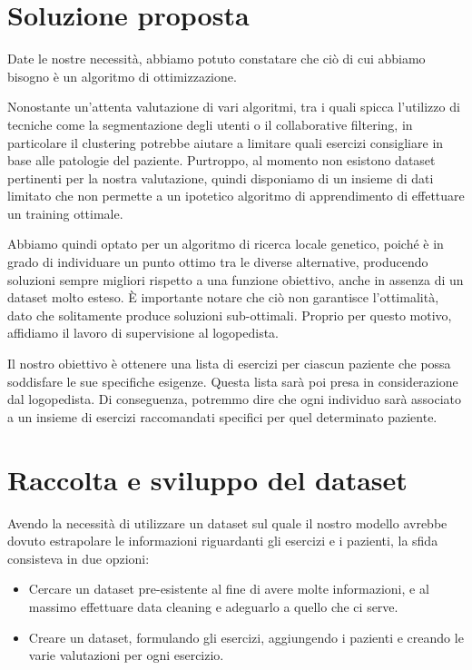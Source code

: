 \documentclass{article}
\begin{document}
    \pagebreak

    \section{Soluzione proposta}

    Date le nostre necessità, abbiamo potuto constatare che ciò di cui abbiamo bisogno è un algoritmo di ottimizzazione.

    Nonostante un'attenta valutazione di vari algoritmi, tra i quali spicca l'utilizzo di tecniche come la segmentazione degli utenti o il collaborative filtering,
    in particolare il clustering potrebbe aiutare a limitare quali esercizi consigliare in base alle patologie del paziente. Purtroppo, al momento non esistono
    dataset pertinenti per la nostra valutazione, quindi disponiamo di un insieme di dati limitato che non permette a un ipotetico algoritmo di apprendimento di
    effettuare un training ottimale.

    Abbiamo quindi optato per un algoritmo di ricerca locale genetico, poiché è in grado di individuare un punto ottimo tra le diverse alternative, producendo
    soluzioni sempre migliori rispetto a una funzione obiettivo, anche in assenza di un dataset molto esteso. È importante notare che ciò non garantisce l'ottimalità,
    dato che solitamente produce soluzioni sub-ottimali. Proprio per questo motivo, affidiamo il lavoro di supervisione al logopedista.

    Il nostro obiettivo è ottenere una lista di esercizi per ciascun paziente che possa soddisfare le sue specifiche esigenze. Questa lista sarà poi presa in
    considerazione dal logopedista. Di conseguenza, potremmo dire che ogni individuo sarà associato a un insieme di esercizi raccomandati specifici per quel determinato
    paziente.

    \section{Raccolta e sviluppo del dataset}

    Avendo la necessità di utilizzare un dataset sul quale il nostro modello avrebbe dovuto estrapolare le informazioni riguardanti gli esercizi e i pazienti, la sfida consisteva in due opzioni:

    \begin{itemize}
        \item Cercare un dataset pre-esistente al fine di avere molte informazioni, e al massimo effettuare data cleaning e adeguarlo a quello che ci serve.
        \item Creare un dataset, formulando gli esercizi, aggiungendo i pazienti e creando le varie valutazioni per ogni esercizio.
    \end{itemize}
\end{document}
